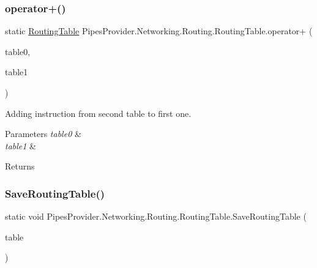 \subsubsection{\texorpdfstring{operator+()}{operator+()}}
{\footnotesize\ttfamily static \mbox{\hyperlink{class_pipes_provider_1_1_networking_1_1_routing_1_1_routing_table}{Routing\+Table}} Pipes\+Provider.\+Networking.\+Routing.\+Routing\+Table.\+operator+ (\begin{DoxyParamCaption}\item[{\mbox{\hyperlink{class_pipes_provider_1_1_networking_1_1_routing_1_1_routing_table}{Routing\+Table}}}]{table0,  }\item[{\mbox{\hyperlink{class_pipes_provider_1_1_networking_1_1_routing_1_1_routing_table}{Routing\+Table}}}]{table1 }\end{DoxyParamCaption})\hspace{0.3cm}{\ttfamily [static]}}



Adding instruction from second table to first one. 


\begin{DoxyParams}{Parameters}
{\em table0} & \\
\hline
{\em table1} & \\
\hline
\end{DoxyParams}
\begin{DoxyReturn}{Returns}

\end{DoxyReturn}
\mbox{\label{class_pipes_provider_1_1_networking_1_1_routing_1_1_routing_table_a28de144d3afcb29a69cd2a51b2af41a9}} 
\subsubsection{\texorpdfstring{Save\+Routing\+Table()}{SaveRoutingTable()}\hspace{0.1cm}{\footnotesize\ttfamily [1/3]}}
{\footnotesize\ttfamily static void Pipes\+Provider.\+Networking.\+Routing.\+Routing\+Table.\+Save\+Routing\+Table (\begin{DoxyParamCaption}\item[{\mbox{\hyperlink{class_pipes_provider_1_1_networking_1_1_routing_1_1_routing_table}{Routing\+Table}}}]{table }\end{DoxyParamCaption})\hspace{0.3cm}{\ttfamily [static]}}



